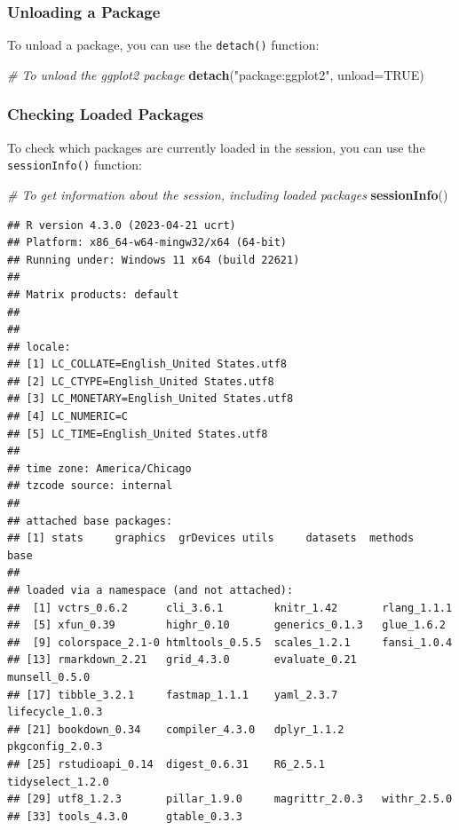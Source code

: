 \documentclass[
  b5paper]{book}
\newenvironment{Shaded}{\begin{snugshade}}{\end{snugshade}}
\newcommand{\AttributeTok}[1]{\textcolor[rgb]{0.13,0.29,0.53}{#1}}
\newcommand{\CommentTok}[1]{\textcolor[rgb]{0.56,0.35,0.01}{\textit{#1}}}
\newcommand{\ConstantTok}[1]{\textcolor[rgb]{0.56,0.35,0.01}{#1}}
\newcommand{\FunctionTok}[1]{\textcolor[rgb]{0.13,0.29,0.53}{\textbf{#1}}}
\newcommand{\NormalTok}[1]{#1}
\newcommand{\StringTok}[1]{\textcolor[rgb]{0.31,0.60,0.02}{#1}}
\begin{document}
\hypertarget{unloading-a-package}{%
\subsubsection*{Unloading a Package}\label{unloading-a-package}}

To unload a package, you can use the \texttt{detach()} function:

\begin{Shaded}
\begin{Highlighting}[]
\CommentTok{\# To unload the ggplot2 package}
\FunctionTok{detach}\NormalTok{(}\StringTok{"package:ggplot2"}\NormalTok{, }\AttributeTok{unload=}\ConstantTok{TRUE}\NormalTok{)}
\end{Highlighting}
\end{Shaded}

\hypertarget{checking-loaded-packages}{%
\subsubsection*{Checking Loaded Packages}\label{checking-loaded-packages}}

To check which packages are currently loaded in the session, you can use the \texttt{sessionInfo()} function:

\begin{Shaded}
\begin{Highlighting}[]
\CommentTok{\# To get information about the session, including loaded packages}
\FunctionTok{sessionInfo}\NormalTok{()}
\end{Highlighting}
\end{Shaded}

\begin{verbatim}
## R version 4.3.0 (2023-04-21 ucrt)
## Platform: x86_64-w64-mingw32/x64 (64-bit)
## Running under: Windows 11 x64 (build 22621)
## 
## Matrix products: default
## 
## 
## locale:
## [1] LC_COLLATE=English_United States.utf8 
## [2] LC_CTYPE=English_United States.utf8   
## [3] LC_MONETARY=English_United States.utf8
## [4] LC_NUMERIC=C                          
## [5] LC_TIME=English_United States.utf8    
## 
## time zone: America/Chicago
## tzcode source: internal
## 
## attached base packages:
## [1] stats     graphics  grDevices utils     datasets  methods   base     
## 
## loaded via a namespace (and not attached):
##  [1] vctrs_0.6.2      cli_3.6.1        knitr_1.42       rlang_1.1.1     
##  [5] xfun_0.39        highr_0.10       generics_0.1.3   glue_1.6.2      
##  [9] colorspace_2.1-0 htmltools_0.5.5  scales_1.2.1     fansi_1.0.4     
## [13] rmarkdown_2.21   grid_4.3.0       evaluate_0.21    munsell_0.5.0   
## [17] tibble_3.2.1     fastmap_1.1.1    yaml_2.3.7       lifecycle_1.0.3 
## [21] bookdown_0.34    compiler_4.3.0   dplyr_1.1.2      pkgconfig_2.0.3 
## [25] rstudioapi_0.14  digest_0.6.31    R6_2.5.1         tidyselect_1.2.0
## [29] utf8_1.2.3       pillar_1.9.0     magrittr_2.0.3   withr_2.5.0     
## [33] tools_4.3.0      gtable_0.3.3
\end{verbatim}
\end{document}
